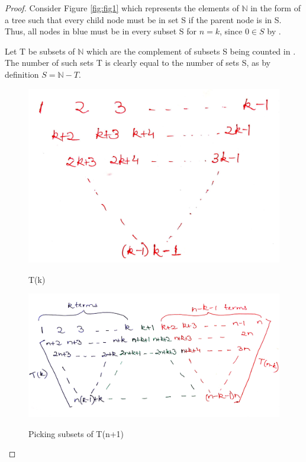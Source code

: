 \documentclass[12pt,reqno]{amsart}
\theoremstyle{definition}
\begin{document}
\begin{proof}
  
  
  Consider Figure \ref{fig:fig1} which represents the elements of $\mathbb{N}$ in the form of a tree such that every child node must be in set S if the parent node is in S. Thus, all nodes in blue must be in every subset S for $n=k$, since $0 \in S$ by \textit{}.
  
  Let T be subsets of $\mathbb{N}$ which are the complement of subsets S being counted in \textit{}. The number of such sets T is clearly equal to the number of sets S, as by definition $S = \mathbb{N} - T$.
  \begin{figure}[h]
  \centering
  \caption{T(k)}
  \includegraphics[scale=0.12]{tk.jpg}
  \label{fig:fig2}
  \end{figure}
  \begin{figure}[h]
  \centering
  \caption{Picking subsets of T(n+1)}
  \includegraphics[scale=0.125, angle=-1]{picking.png}
  \label{fig:fig3}
  \end{figure}
  

\end{proof}
\end{document}
